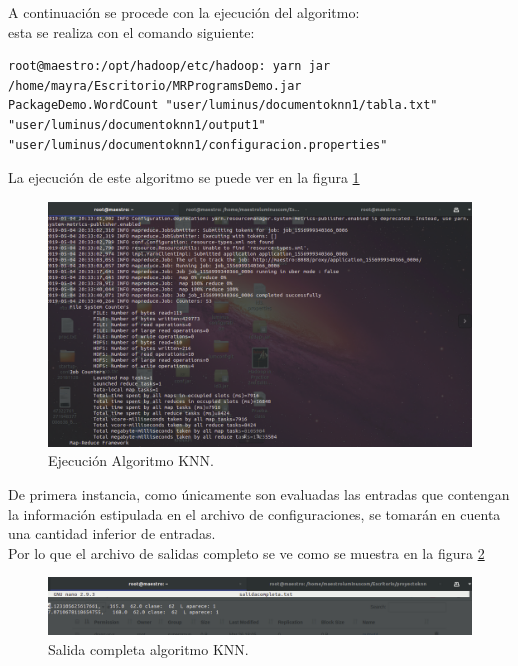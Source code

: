A continuación se procede con la ejecución del algoritmo:
\\
esta se realiza con el comando siguiente:
\begin{verbatim}
root@maestro:/opt/hadoop/etc/hadoop: yarn jar /home/mayra/Escritorio/MRProgramsDemo.jar 
PackageDemo.WordCount "user/luminus/documentoknn1/tabla.txt" "user/luminus/documentoknn1/output1" "user/luminus/documentoknn1/configuracion.properties"
\end{verbatim} 
La ejecución de este algoritmo se puede ver en la figura \ref{fig:knn2ex}
\begin{figure}[H]
	\begin{center}
		\hypertarget{fig:knn2ex}{\hspace{1pt}}
		\includegraphics[width=.9\textwidth]{capitulo4a/images/ejecucionknn.png}
		\caption{Ejecución Algoritmo KNN.}
		\label{fig:knn2ex}
	\end{center}
\end{figure}
De primera instancia, como únicamente son evaluadas las entradas que contengan la información estipulada en el archivo de configuraciones, se tomarán en cuenta una cantidad inferior de entradas. \\
Por lo que el archivo de salidas completo se ve como se muestra en la figura \ref{fig:knn2ex1}
\begin{figure}[H]
	\begin{center}
		\hypertarget{fig:knn2ex1}{\hspace{1pt}}
		\includegraphics[width=.9\textwidth]{capitulo4a/images/salidacompleta.png}
		\caption{Salida completa algoritmo KNN.}
		\label{fig:knn2ex1}
	\end{center}
\end{figure}
